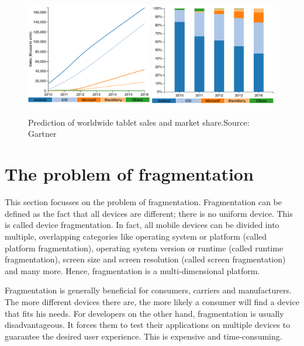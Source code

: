 \begin{figure}[h!]
    \begin{center}
        \includegraphics[width=0.49\textwidth]{figs/tablet_sales.pdf}
        \includegraphics[width=0.49\textwidth]{figs/tablet_share.pdf}
        \caption{Prediction of worldwide tablet sales and market share.\newline Source: Gartner \citeGartnerTab
        }
        \label{fig:tablet}
    \end{center}
\end{figure}

\section{The problem of fragmentation}

This section focusses on the problem of fragmentation. Fragmentation can be defined as the fact that all devices are different; there is no uniform device. This is called device fragmentation. In fact, all mobile devices can be divided into multiple, overlapping categories like operating system or platform (called platform fragmentation), operating system version or runtime (called runtime fragmentation), screen size and screen resolution (called screen fragmentation) and many more. Hence, fragmentation is a multi-dimensional platform. 

Fragmentation is generally beneficial for consumers, carriers and manufacturers. The more different devices there are, the more likely a consumer will find a device that fits his needs. For developers on the other hand, fragmentation is usually disadvantageous. It forces them to test their applications on multiple devices to guarantee the desired user experience. This is expensive and time-consuming. 

